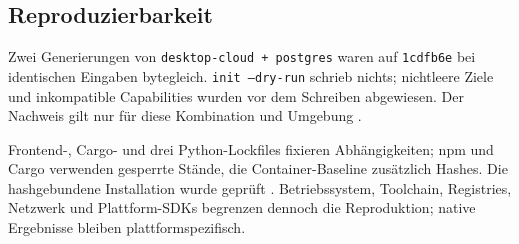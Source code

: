\subsection{Reproduzierbarkeit}
\label{subsec:reproduzierbarkeit}

Zwei Generierungen von \texttt{desktop-cloud + postgres} waren auf
\texttt{1cdfb6e} bei identischen Eingaben bytegleich. \texttt{init --dry-run}
schrieb nichts; nichtleere Ziele und inkompatible Capabilities wurden vor dem
Schreiben abgewiesen. Der Nachweis gilt nur für diese Kombination und Umgebung
\parencite{kleiveist2026acceptance,lamb2022reproducible-builds}.

Frontend-, Cargo- und drei Python-Lockfiles fixieren Abhängigkeiten; npm und
Cargo verwenden gesperrte Stände, die Container-Baseline zusätzlich Hashes.
Die hashgebundene Installation wurde geprüft
\parencite{kleiveist2026ci,kleiveist2026container}. Betriebssystem, Toolchain,
Registries, Netzwerk und Plattform-SDKs begrenzen dennoch die Reproduktion;
native Ergebnisse bleiben plattformspezifisch.
